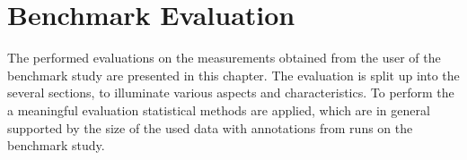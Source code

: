 
\chapter{Benchmark Evaluation}\label{ord:ch5}

The performed evaluations on the measurements obtained from the user of the benchmark study are presented in this chapter.
The evaluation is split up into the several sections, to illuminate various aspects and characteristics.
To perform the a meaningful evaluation statistical methods are applied, which are in general supported by the size of the used data with \getNumberBenchmarkAnnotations \space annotations from \getNumberBenchmarkRuns \space runs on the benchmark study.









